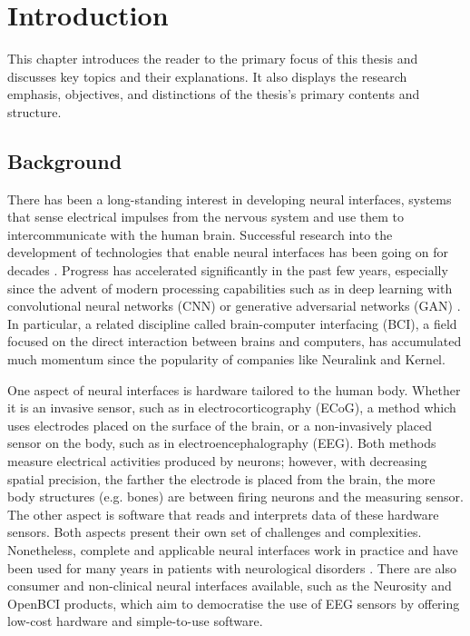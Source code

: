 \chapter{Introduction}
\graphicspath{{Chapter1/Figs/}{Chapter1/Figs/}}

This chapter introduces the reader to the primary focus of this thesis and discusses key topics and their explanations. It also displays the research emphasis, objectives, and distinctions of the thesis's primary contents and structure.

\section{Background}
\label{chapter1-background}

There has been a long-standing interest in developing neural interfaces, systems that sense electrical impulses from the nervous system and use them to intercommunicate with the human brain. Successful research into the development of technologies that enable neural interfaces has been going on for decades \citep{vidal_real-time_1977}. Progress has accelerated significantly in the past few years, especially since the advent of modern processing capabilities such as in deep learning with convolutional neural networks (CNN) or generative adversarial networks (GAN) \citep{gonfalonieri_deep_2019}. In particular, a related discipline called brain-computer interfacing (BCI), a field focused on the direct interaction between brains and computers, has accumulated much momentum since the popularity of companies like Neuralink and Kernel.

One aspect of neural interfaces is hardware tailored to the human body. Whether it is an invasive sensor, such as in electrocorticography (ECoG), a method which uses electrodes placed on the surface of the brain, or a non-invasively placed sensor on the body, such as in electroencephalography (EEG). Both methods measure electrical activities produced by neurons; however, with decreasing spatial precision, the farther the electrode is placed from the brain, the more body structures (e.g. bones) are between firing neurons and the measuring sensor. The other aspect is software that reads and interprets data of these hardware sensors. Both aspects present their own set of challenges and complexities. Nonetheless, complete and applicable neural interfaces work in practice and have been used for many years in patients with neurological disorders \citep{braingate_publications_nodate}. There are also consumer and non-clinical neural interfaces available, such as the Neurosity and OpenBCI products, which aim to democratise the use of EEG sensors by offering low-cost hardware and simple-to-use software.


